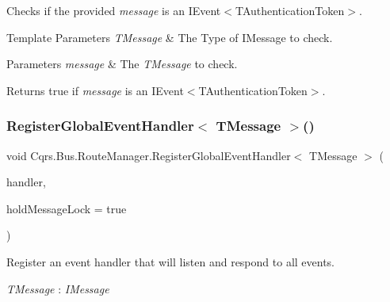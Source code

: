 Checks if the provided {\itshape message}  is an I\+Event$<$\+T\+Authentication\+Token$>$. 


\begin{DoxyTemplParams}{Template Parameters}
{\em T\+Message} & The Type of I\+Message to check.\\
\hline
\end{DoxyTemplParams}

\begin{DoxyParams}{Parameters}
{\em message} & The {\itshape T\+Message}  to check. \\
\hline
\end{DoxyParams}
\begin{DoxyReturn}{Returns}
true if {\itshape message}  is an I\+Event$<$\+T\+Authentication\+Token$>$.
\end{DoxyReturn}
\mbox{\label{classCqrs_1_1Bus_1_1RouteManager_a1f8fb95b11955aa0762a76f9b39233ec_a1f8fb95b11955aa0762a76f9b39233ec}} 
\subsubsection{\texorpdfstring{Register\+Global\+Event\+Handler$<$ T\+Message $>$()}{RegisterGlobalEventHandler< TMessage >()}}
{\footnotesize\ttfamily void Cqrs.\+Bus.\+Route\+Manager.\+Register\+Global\+Event\+Handler$<$ T\+Message $>$ (\begin{DoxyParamCaption}\item[{Action$<$ T\+Message $>$}]{handler,  }\item[{bool}]{hold\+Message\+Lock = {\ttfamily true} }\end{DoxyParamCaption})}



Register an event handler that will listen and respond to all events. 

\begin{Desc}
\item[Type Constraints]\begin{description}
\item[{\em T\+Message} : {\em I\+Message}]\end{description}
\end{Desc}
\mbox{\label{classCqrs_1_1Bus_1_1RouteManager_a5a01e8a6c9ae6311bca2d9e5cb75a7b9_a5a01e8a6c9ae6311bca2d9e5cb75a7b9}} 

